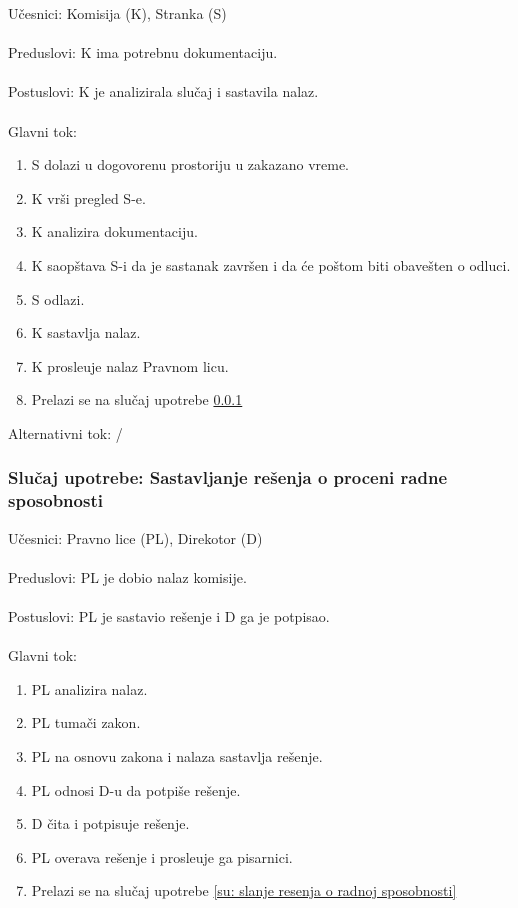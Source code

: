 \noindent U\v cesnici: Komisija (K), Stranka (S)
\\
\\ Preduslovi: K ima potrebnu dokumentaciju.
\\
\\ Postuslovi: K je analizirala slu\v caj i sastavila nalaz.
\\
\\ Glavni tok:
\begin{enumerate}
	\item S dolazi u dogovorenu prostoriju u zakazano vreme.
	\item K vr\v si pregled S-e.
	\item K analizira dokumentaciju.
	\item K saop\v stava S-i da je sastanak zavr\v sen i da \' ce po\v stom biti obave\v sten o odluci.
	\item S odlazi.
	\item K sastavlja nalaz.
	\item K prosle\dj uje nalaz Pravnom licu.
	\item Prelazi se na slu\v caj upotrebe \ref{su: resenje o rs} 
\end{enumerate}

\noindent Alternativni tok: /


\subsubsection{Slu\v caj upotrebe: Sastavljanje re\v senja o proceni radne sposobnosti}
\label{su: resenje o rs}
\noindent U\v cesnici: Pravno lice (PL), Direkotor (D)
\\
\\ Preduslovi: PL je dobio nalaz komisije.
\\
\\ Postuslovi: PL je sastavio re\v senje i D ga je potpisao.
\\
\\ Glavni tok:
\begin{enumerate}
	\item PL analizira nalaz.
	\item PL tuma\v ci zakon.
	\item PL na osnovu zakona i nalaza sastavlja re\v senje.
	\item PL odnosi D-u da potpi\v se re\v senje.
	\item D \v cita i potpisuje re\v senje.
	\item PL overava re\v senje i prosle\dj uje ga pisarnici. 
	\item Prelazi se na slu\v caj upotrebe \ref{su: slanje resenja o radnoj sposobnosti}
\end{enumerate}

